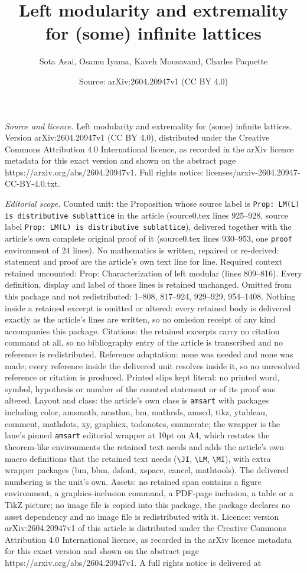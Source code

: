 \documentclass[10pt,a4paper]{amsart}
\title[Left modularity and extremality for (some) infinite lattices]{Left modularity and extremality for (some) infinite lattices}
\author{Sota Asai, Osamu Iyama, Kaveh Mousavand, Charles Paquette}
\date{Source: arXiv:2604.20947v1 (CC BY 4.0)}
\begin{document}
\maketitle

\noindent\emph{Source and licence.} Left modularity and extremality for (some) infinite lattices. Version arXiv:2604.20947v1 (CC BY 4.0), distributed under the Creative Commons Attribution 4.0 International licence, as recorded in the arXiv licence metadata for this exact version and shown on the abstract page https://arxiv.org/abs/2604.20947v1. Full rights notice: licenses/arxiv-2604.20947-CC-BY-4.0.txt.\par\smallskip

\noindent\textit{Editorial scope.} Counted unit: the Proposition whose source label is \texttt{Prop: LM(L) is distributive sublattice} in the article (source0.tex lines 925--928, source label \texttt{Prop: LM(L) is distributive sublattice}), delivered together with the article's own complete original proof of it (source0.tex lines 930--953, one \texttt{proof} environment of 24 lines). No mathematics is written, repaired or re-derived: statement and proof are the article's own text line for line. Required context retained uncounted: Prop: Characterization of left modular (lines 809--816). Every definition, display and label of those lines is retained unchanged. Omitted from this package and not redistributed: 1--808, 817--924, 929--929, 954--1408. Nothing inside a retained excerpt is omitted or altered: every retained body is delivered exactly as the article's lines are written, so no omission receipt of any kind accompanies this package. Citations: the retained excerpts carry no citation command at all, so no bibliography entry of the article is transcribed and no reference is redistributed. Reference adaptation: none was needed and none was made; every reference inside the delivered unit resolves inside it, so no unresolved reference or citation is produced. Printed slips kept literal: no printed word, symbol, hypothesis or number of the counted statement or of its proof was altered. Layout and class: the article's own class is \texttt{amsart} with packages including color, amsmath, amsthm, bm, mathrsfs, amscd, tikz, ytableau, comment, mathdots, xy, graphicx, todonotes, enumerate; the wrapper is the lane's pinned \texttt{amsart} editorial wrapper at 10pt on A4, which restates the theorem-like environments the retained text needs and adds the article's own macro definitions that the retained text needs (\texttt{\textbackslash JI}, \texttt{\textbackslash LM}, \texttt{\textbackslash MI}), with extra wrapper packages (bm, bbm, dsfont, xspace, cancel, mathtools). The delivered numbering is the unit's own. Assets: no retained span contains a figure environment, a graphics-inclusion command, a PDF-page inclusion, a table or a TikZ picture; no image file is copied into this package, the package declares no asset dependency and no image file is redistributed with it. Licence: version arXiv:2604.20947v1 of this article is distributed under the Creative Commons Attribution 4.0 International licence, as recorded in the arXiv licence metadata for this exact version and shown on the abstract page https://arxiv.org/abs/2604.20947v1. A full rights notice is delivered at 
\end{document}
